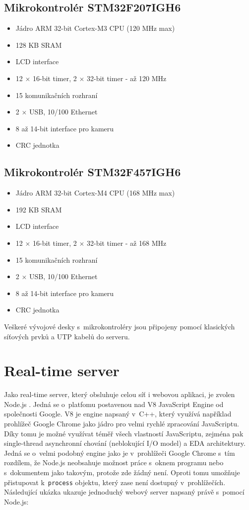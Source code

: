 \subsection{Mikrokontrolér STM32F207IGH6}
\begin{itemize}
\itemsep0em
\item Jádro ARM 32-bit Cortex\texttrademark-M3 CPU (120 MHz max)
\item 128 KB SRAM
\item LCD interface
\item 12 \ensuremath{\times} 16-bit timer, 2 \ensuremath{\times} 32-bit timer - až 120 MHz
\item 15 komunikačních rozhraní
\item 2 \ensuremath{\times} USB, 10/100 Ethernet
\item 8 až 14-bit interface pro kameru
\item CRC jednotka
\end{itemize}

\subsection{Mikrokontrolér STM32F457IGH6}
\begin{itemize}
\itemsep0em
\item Jádro ARM 32-bit Cortex\texttrademark-M4 CPU (168 MHz max)
\item 192 KB SRAM
\item LCD interface
\item 12 \ensuremath{\times} 16-bit timer, 2 \ensuremath{\times} 32-bit timer - až 168 MHz
\item 15 komunikačních rozhraní
\item 2 \ensuremath{\times} USB, 10/100 Ethernet
\item 8 až 14-bit interface pro kameru
\item CRC jednotka
\end{itemize}

Veškeré vývojové desky s~mikrokontroléry jsou připojeny pomocí klasických síťových prvků a UTP kabelů do serveru.

\section{Real-time server}
Jako real-time  server, který obsluhuje celou síť i webovou aplikaci, je zvolen Node.js \cite{nodejs}.  Jedná se o~platfomu postavenou nad V8 JavaScript Engine od společnosti Google. V8  je engine napsaný v~C++, který využívá například prohlížeč Google Chrome jako jádro pro velmi rychlé zpracování JavaScriptu. Díky tomu je možné využívat téměř všech vlastností JavaScriptu, zejména pak single-thread asynchronní chování (neblokující I/O model) a EDA architektury. Jedná se o~velmi podobný engine jako je v~prohlížeči Google Chrome s~tím rozdílem, že Node.js neobsahuje možnost práce s~oknem programu nebo s~dokumentem jako takovým, protože zde žádný není. Oproti tomu umožňuje přistupovat k~\texttt{process} objektu, který zase není dostupný v~prohlížečích. Následující ukázka ukazuje jednoduchý webový server napsaný právě s~pomocí Node.js:

